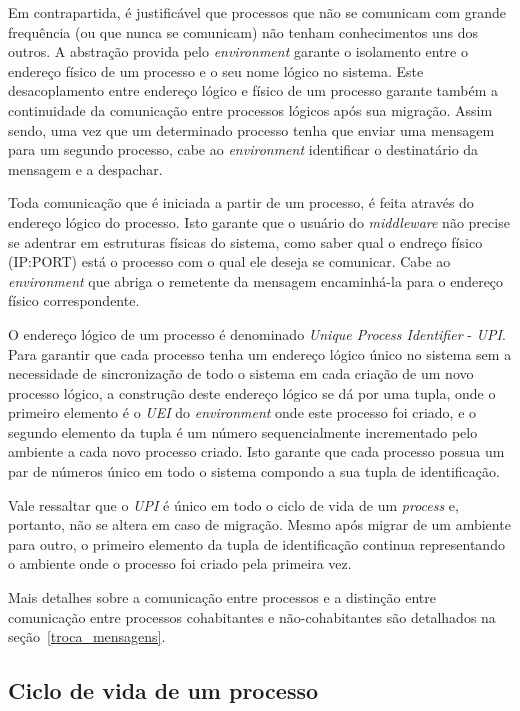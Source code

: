 Em contrapartida, é justificável que processos que não se comunicam com grande frequência (ou que nunca se comunicam) não tenham conhecimentos uns dos outros. A abstração provida pelo \textit{environment} garante o isolamento entre o endereço físico de um processo e o seu nome lógico no sistema. Este desacoplamento entre endereço lógico e físico de um processo garante também a continuidade da comunicação entre processos lógicos após sua migração. Assim sendo, uma vez que um determinado processo tenha que enviar uma mensagem para um segundo processo, cabe ao \textit{environment} identificar o destinatário da mensagem e a despachar.

Toda comunicação que é iniciada a partir de um processo, é feita através do endereço lógico do processo. Isto garante que o usuário do \textit{middleware} não precise se adentrar em estruturas físicas do sistema, como saber qual o endreço físico (IP:PORT) está o processo com o qual ele deseja se comunicar. Cabe ao \textit{environment} que abriga o remetente da mensagem encaminhá-la para o endereço físico correspondente.

O endereço lógico de um processo é denominado \textit{Unique Process Identifier} - \textit{UPI}. Para garantir que cada processo tenha um endereço lógico único no sistema sem a necessidade de sincronização de todo o sistema em cada criação de um novo processo lógico, a construção deste endereço lógico se dá por uma tupla, onde o primeiro elemento é o \textit{UEI} do \textit{environment} onde este processo foi criado, e o segundo elemento da tupla é um número sequencialmente incrementado pelo ambiente a cada novo processo criado. Isto garante que cada processo possua um par de números único em todo o sistema compondo a sua tupla de identificação.

Vale ressaltar que o \textit{UPI} é único em todo o ciclo de vida de um \textit{process} e, portanto, não se altera em caso de migração. Mesmo após migrar de um ambiente para outro, o primeiro elemento da tupla de identificação continua representando o ambiente onde o processo foi criado pela primeira vez.

Mais detalhes sobre a comunicação entre processos e a distinção entre comunicação entre processos cohabitantes e não-cohabitantes são detalhados na seção~\ref{troca_mensagens}.

\subsection{Ciclo de vida de um processo}

